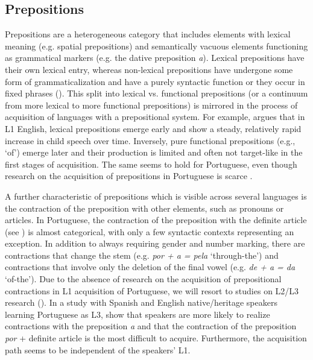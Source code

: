 \documentclass[output=paper]{langscibook}
\begin{document}
\subsection{Prepositions}\label{sec:rinke:3.3}

Prepositions are a heterogeneous category that includes elements with lexical meaning (e.g. spatial prepositions) and semantically vacuous elements functioning as grammatical markers (e.g. the dative preposition \textit{a}). Lexical prepositions have their own lexical entry, whereas non-lexical prepositions have undergone some form of grammaticalization and have a purely syntactic function or they occur in fixed phrases (\citealt{Rauh1993, Riemsdijk1990}). This split into lexical vs. functional prepositions (or a continuum from more lexical to more functional prepositions) is mirrored in the process of acquisition of languages with a prepositional system. For example, \citet{Littlefield2009} argues that in L1 English, lexical prepositions emerge early and show a steady, relatively rapid increase in child speech over time. Inversely, pure functional prepositions (e.g., `of') emerge later and their production is limited and often not target-like in the first stages of acquisition. The same seems to hold for Portuguese, even though research on the acquisition of prepositions in Portuguese is scarce \citep{Teodoro2020}.

A further characteristic of prepositions which is visible across several languages is the contraction of the preposition with other elements, such as pronouns or articles. In Portuguese, the contraction of the preposition with the definite article (see ) is almost categorical, with only a few syntactic contexts representing an exception. In addition to always requiring gender and number marking, there are contractions that change the stem (e.g. \textit{por + a = pela} ‘through-the’) and contractions that involve only the deletion of the final vowel (e.g. \textit{de + a = da} ‘of-the’). Due to the absence of research on the acquisition of prepositional contractions in L1 acquisition of Portuguese, we will resort to studies on L2/L3 research (\citealt{Brito2018, PicoralCarvalho2020}). In a study with Spanish and English native\slash heritage speakers learning Portuguese as L3, \citet{PicoralCarvalho2020} show that speakers are more likely to realize contractions with the preposition \textit{a} and that the contraction of the preposition \textit{por} + definite article is the most difficult to acquire. Furthermore, the acquisition path seems to be independent of the speakers' L1.
\end{document}
